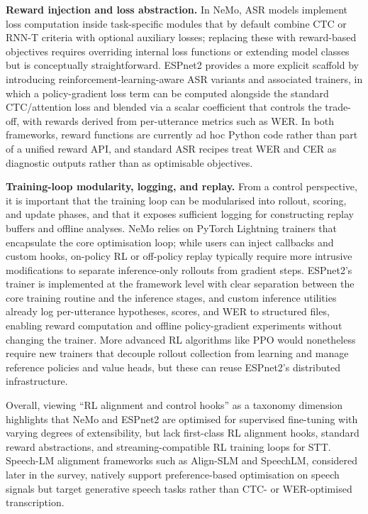 \documentclass[conference]{IEEEtran}
\begin{document}
\textbf{Reward injection and loss abstraction.}
In NeMo, ASR models implement loss computation inside task-specific modules that by default combine CTC or RNN-T criteria with optional auxiliary losses; replacing these with reward-based objectives requires overriding internal loss functions or extending model classes but is conceptually straightforward.
ESPnet2 provides a more explicit scaffold by introducing reinforcement-learning-aware ASR variants and associated trainers, in which a policy-gradient loss term can be computed alongside the standard CTC/attention loss and blended via a scalar coefficient that controls the trade-off, with rewards derived from per-utterance metrics such as WER.
In both frameworks, reward functions are currently ad hoc Python code rather than part of a unified reward API, and standard ASR recipes treat WER and CER as diagnostic outputs rather than as optimisable objectives.

\textbf{Training-loop modularity, logging, and replay.}
From a control perspective, it is important that the training loop can be modularised into rollout, scoring, and update phases, and that it exposes sufficient logging for constructing replay buffers and offline analyses.
NeMo relies on PyTorch Lightning trainers that encapsulate the core optimisation loop; while users can inject callbacks and custom hooks, on-policy RL or off-policy replay typically require more intrusive modifications to separate inference-only rollouts from gradient steps.
ESPnet2’s trainer is implemented at the framework level with clear separation between the core training routine and the inference stages, and custom inference utilities already log per-utterance hypotheses, scores, and WER to structured files, enabling reward computation and offline policy-gradient experiments without changing the trainer.
More advanced RL algorithms like PPO would nonetheless require new trainers that decouple rollout collection from learning and manage reference policies and value heads, but these can reuse ESPnet2’s distributed infrastructure.

Overall, viewing ``RL alignment and control hooks'' as a taxonomy dimension highlights that NeMo and ESPnet2 are optimised for supervised fine-tuning with varying degrees of extensibility, but lack first-class RL alignment hooks, standard reward abstractions, and streaming-compatible RL training loops for STT.
Speech-LM alignment frameworks such as Align-SLM and SpeechLM, considered later in the survey, natively support preference-based optimisation on speech signals but target generative speech tasks rather than CTC- or WER-optimised transcription.
\end{document}
